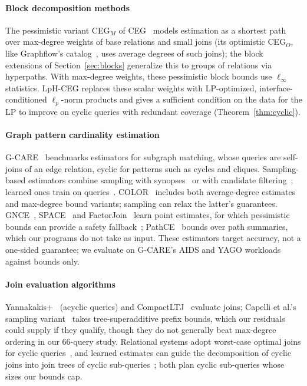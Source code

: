 \documentclass[sigconf, nonacm, acmthm=false]{acmart}
\begin{document}
\paragraph{Block decomposition methods}
The pessimistic variant CEG$_M$ of CEG~\cite{chen2022ceg,salihoglu2026ceg} models estimation as a shortest path over max-degree weights of base relations and small joins (its optimistic CEG$_O$, like Graphflow's catalog~\cite{mhedhbi2019graphflow}, uses average degrees of such joins); the block extensions of Section~\ref{sec:blocks} generalize this to groups of relations via hyperpaths. With max-degree weights, these pessimistic block bounds use $\ell_\infty$ statistics. LpH-CEG replaces these scalar weights with LP-optimized, interface-conditioned $\ell_p$-norm products and
gives a sufficient condition on the data for the LP to improve on cyclic queries with
redundant coverage (Theorem~\ref{thm:cyclic}).

\paragraph{Graph pattern cardinality estimation}
G-CARE~\cite{park2020gcare} benchmarks estimators for subgraph matching,
whose queries are self-joins of an edge relation, cyclic for patterns
such as cycles and cliques.
Sampling-based estimators combine sampling with
synopses~\cite{kim2021alley} or with candidate
filtering~\cite{shin2024fastest}; learned ones train on
queries~\cite{zhao2021lss,wang2022neursc}.
COLOR~\cite{deeds2025color} includes both average-degree estimates and max-degree bound variants; sampling can relax the latter's guarantees. GNCE~\cite{schwabe2024gnce}, SPACE~\cite{aytimur2025space} and FactorJoin~\cite{wu2023factorjoin} learn point estimates, for which pessimistic bounds can provide a safety fallback~\cite{abokhamis2025pessimistic}; PathCE~\cite{wang2025pathce} bounds over path summaries, which our programs do not take as input.
These estimators target accuracy, not a one-sided guarantee; we
evaluate on G-CARE's AIDS and YAGO workloads against bounds only.

\paragraph{Join evaluation algorithms}
Yannakakis+~\cite{wang2025yannakakis} (acyclic queries) and CompactLTJ~\cite{arroyuelo2025compactltj} evaluate joins; Capelli et al.'s sampling variant~\cite{capelli2025simple} takes tree-superadditive prefix bounds, which our residuals could supply if they qualify, though they do not generally beat max-degree ordering in our $66$-query study. Relational systems adopt worst-case
optimal joins for cyclic queries~\cite{freitag2020wcoj}, and learned
estimates can guide the decomposition of cyclic joins into join trees of
cyclic sub-queries~\cite{zhang2022cyclic}; both plan cyclic sub-queries whose
sizes our bounds cap.
\end{document}

